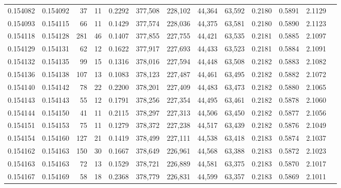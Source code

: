 \begin{tabular}{rrrrrrrrrrrrr}
0.154082 & 0.154092 &    37 &  11 &                                     0.2292 & 377,508 & 228,102 &  44,364 &  63,592 & 0.2180 & 0.5891 & 2.1129 \\
0.154093 & 0.154115 &    66 &  11 &                                     0.1429 & 377,574 & 228,036 &  44,375 &  63,581 & 0.2180 & 0.5890 & 2.1123 \\
0.154118 & 0.154128 &   281 &  46 &                                     0.1407 & 377,855 & 227,755 &  44,421 &  63,535 & 0.2181 & 0.5885 & 2.1097 \\
0.154129 & 0.154131 &    62 &  12 &                                     0.1622 & 377,917 & 227,693 &  44,433 &  63,523 & 0.2181 & 0.5884 & 2.1091 \\
0.154132 & 0.154135 &    99 &  15 &                                     0.1316 & 378,016 & 227,594 &  44,448 &  63,508 & 0.2182 & 0.5883 & 2.1082 \\
0.154136 & 0.154138 &   107 &  13 &                                     0.1083 & 378,123 & 227,487 &  44,461 &  63,495 & 0.2182 & 0.5882 & 2.1072 \\
0.154140 & 0.154142 &    78 &  22 &                                     0.2200 & 378,201 & 227,409 &  44,483 &  63,473 & 0.2182 & 0.5880 & 2.1065 \\
0.154143 & 0.154143 &    55 &  12 &                                     0.1791 & 378,256 & 227,354 &  44,495 &  63,461 & 0.2182 & 0.5878 & 2.1060 \\
0.154144 & 0.154150 &    41 &  11 &                                     0.2115 & 378,297 & 227,313 &  44,506 &  63,450 & 0.2182 & 0.5877 & 2.1056 \\
0.154151 & 0.154153 &    75 &  11 &                                     0.1279 & 378,372 & 227,238 &  44,517 &  63,439 & 0.2182 & 0.5876 & 2.1049 \\
0.154154 & 0.154160 &   127 &  21 &                                     0.1419 & 378,499 & 227,111 &  44,538 &  63,418 & 0.2183 & 0.5874 & 2.1037 \\
0.154162 & 0.154163 &   150 &  30 &                                     0.1667 & 378,649 & 226,961 &  44,568 &  63,388 & 0.2183 & 0.5872 & 2.1023 \\
0.154163 & 0.154163 &    72 &  13 &                                     0.1529 & 378,721 & 226,889 &  44,581 &  63,375 & 0.2183 & 0.5870 & 2.1017 \\
0.154167 & 0.154169 &    58 &  18 &                                     0.2368 & 378,779 & 226,831 &  44,599 &  63,357 & 0.2183 & 0.5869 & 2.1011 \\

\end{tabular}
